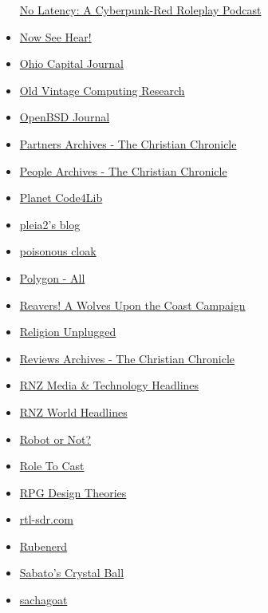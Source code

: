 \begin{itemize}
  \href{https://nolatencypodcast.com/}{No Latency: A Cyberpunk-Red
  Roleplay Podcast}\\
\item
  \href{https://blogs.loc.gov/now-see-hear}{Now See Hear!}
\item
  \href{https://ohiocapitaljournal.com/}{Ohio Capital Journal}
\item
  \href{http://oldvcr.blogspot.com/}{Old Vintage Computing Research}
\item
  \href{https://www.undeadly.org/}{OpenBSD Journal}
\item
  \href{https://christianchronicle.org/category/news/partners/}{Partners
  Archives - The Christian Chronicle}
\item
  \href{https://christianchronicle.org/category/features/people/}{People
  Archives - The Christian Chronicle}
\item
  \href{http://planet.code4lib.org/}{Planet Code4Lib}
\item
  \href{https://princessleia.com/journal}{pleia2's blog}
\item
  \href{https://poisonouscloak.blogspot.com/}{poisonous cloak}
\item
  \href{https://www.polygon.com/}{Polygon - All}
\item
  \href{https://reaverswutc.bearblog.dev/}{Reavers! A Wolves Upon the
  Coast Campaign}
\item
  \href{https://religionunplugged.com/news/}{Religion Unplugged}
\item
  \href{https://christianchronicle.org/category/features/reviews/}{Reviews
  Archives - The Christian Chronicle}
\item
  \href{https://www.rnz.co.nz/news/media-technology}{RNZ Media \&
  Technology Headlines}
\item
  \href{https://www.rnz.co.nz/news/world}{RNZ World Headlines}
\item
  \href{https://www.theincomparable.com/robot/}{Robot or Not?}
\item
  \href{https://roletocast.squarespace.com/}{Role To Cast}
\item
  \href{https://montecook.substack.com/}{RPG Design Theories}
\item
  \href{https://www.rtl-sdr.com/}{rtl-sdr.com}
\item
  \href{https://rubenerd.com/}{Rubenerd}
\item
  \href{https://centerforpolitics.org/crystalball/}{Sabato's Crystal
  Ball}
\item
  \href{https://sachagoat.blot.im/}{sachagoat}

\end{itemize}
